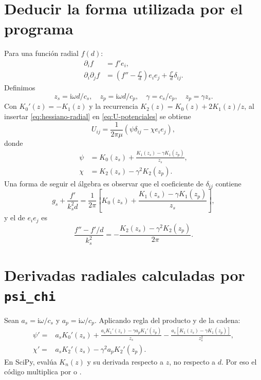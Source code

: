 \documentclass[11pt,a4paper]{report}
\numberwithin{equation}{chapter}
\newcommand{\ii}{\mathrm{i}}
\DeclareRobustCommand{\code}[1]{\texttt{\detokenize{#1}}}
\begin{document}
\section{Deducir la forma utilizada por el programa}
Para una funci\'on radial $f(d)$:
\begin{align}
 \partial_i f&=f'e_i,\\
 \partial_i\partial_j f
   &=\left(f''-\frac{f'}d\right)e_ie_j+\frac{f'}d\delta_{ij}.
 \label{eq:hessiano-radial}
\end{align}
Definimos
\begin{equation}
 z_s=\ii\omega d/c_s,\quad z_p=\ii\omega d/c_p,\quad
 \gamma=c_s/c_p,\quad z_p=\gamma z_s.
\end{equation}
Con $K_0'(z)=-K_1(z)$ y la recurrencia
$K_2(z)=K_0(z)+2K_1(z)/z$, al insertar
\eqref{eq:hessiano-radial} en \eqref{eq:U-potenciales} se obtiene
\begin{equation}
 \boxed{U_{ij}=\frac{1}{2\pi\mu}
             \left(\psi\delta_{ij}-\chi e_ie_j\right),}
 \label{eq:U-final}
\end{equation}
donde
\begin{align}
 \psi&=K_0(z_s)+\frac{K_1(z_s)-\gamma K_1(z_p)}{z_s},\\
 \chi&=K_2(z_s)-\gamma^2K_2(z_p).
 \label{eq:psi-chi}
\end{align}
Una forma de seguir el \'algebra es observar que el coeficiente de
$\delta_{ij}$ contiene
\begin{equation}
 g_s+\frac{f'}{k_s^2d}
 =\frac{1}{2\pi}\left[
 K_0(z_s)+\frac{K_1(z_s)-\gamma K_1(z_p)}{z_s}\right],
\end{equation}
y el de $e_ie_j$ es
\begin{equation}
 \frac{f''-f'/d}{k_s^2}
 =-\frac{K_2(z_s)-\gamma^2K_2(z_p)}{2\pi}.
\end{equation}

\section{Derivadas radiales calculadas por \texttt{psi\_chi}}
Sean $a_s=\ii\omega/c_s$ y $a_p=\ii\omega/c_p$.
Aplicando regla del producto y de la cadena:
\begin{align}
 \psi'={}&a_sK_0'(z_s)
  +\frac{a_sK_1'(z_s)-\gamma a_pK_1'(z_p)}{z_s}
  -\frac{a_s[K_1(z_s)-\gamma K_1(z_p)]}{z_s^2},\\
 \chi'={}&a_sK_2'(z_s)-\gamma^2a_pK_2'(z_p).
 \label{eq:derivadas-kernels}
\end{align}
En SciPy, \code{kv(n,z)} eval\'ua $K_n(z)$ y
\code{kvp(n,z)} su derivada respecto a $z$, no respecto a $d$.
Por eso el c\'odigo multiplica por \code{dzs} o \code{dzp}.
\end{document}
